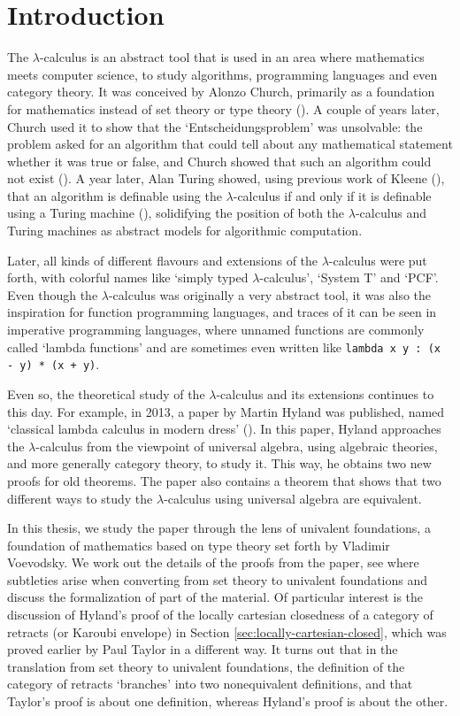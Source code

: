 \chapter{Introduction}

The $ \lambda $-calculus is an abstract tool that is used in an area where mathematics meets computer science, to study algorithms, programming languages and even category theory. It was conceived by Alonzo Church, primarily as a foundation for mathematics instead of set theory or type theory (\autocite{church-lambda-calculus}). A couple of years later, Church used it to show that the `Entscheidungsproblem' was unsolvable: the problem asked for an algorithm that could tell about any mathematical statement whether it was true or false, and Church showed that such an algorithm could not exist (\autocite{church-number-theory}). A year later, Alan Turing showed, using previous work of Kleene (\autocite{kleene-lambda}), that an algorithm is definable using the $ \lambda $-calculus if and only if it is definable using a Turing machine (\autocite{turing-lambda}), solidifying the position of both the $ \lambda $-calculus and Turing machines as abstract models for algorithmic computation.

Later, all kinds of different flavours and extensions of the $ \lambda $-calculus were put forth, with colorful names like `simply typed $ \lambda $-calculus', `System T' and `PCF'. Even though the $ \lambda $-calculus was originally a very abstract tool, it was also the inspiration for function programming languages, and traces of it can be seen in imperative programming languages, where unnamed functions are commonly called `lambda functions' and are sometimes even written like \texttt{lambda x y : (x - y) * (x + y)}.

Even so, the theoretical study of the $ \lambda $-calculus and its extensions continues to this day. For example, in 2013, a paper by Martin Hyland was published, named `classical lambda calculus in modern dress' (\autocite{Hyland}). In this paper, Hyland approaches the $ \lambda $-calculus from the viewpoint of universal algebra, using algebraic theories, and more generally category theory, to study it. This way, he obtains two new proofs for old theorems. The paper also contains a theorem that shows that two different ways to study the $ \lambda $-calculus using universal algebra are equivalent.

In this thesis, we study the paper through the lens of univalent foundations, a foundation of mathematics based on type theory set forth by Vladimir Voevodsky. We work out the details of the proofs from the paper, see where subtleties arise when converting from set theory to univalent foundations and discuss the formalization of part of the material. Of particular interest is the discussion of Hyland's proof of the locally cartesian closedness of a category of retracts (or Karoubi envelope) in Section \ref{sec:locally-cartesian-closed}, which was proved earlier by Paul Taylor in a different way. It turns out that in the translation from set theory to univalent foundations, the definition of the category of retracts `branches' into two nonequivalent definitions, and that Taylor's proof is about one definition, whereas Hyland's proof is about the other.

